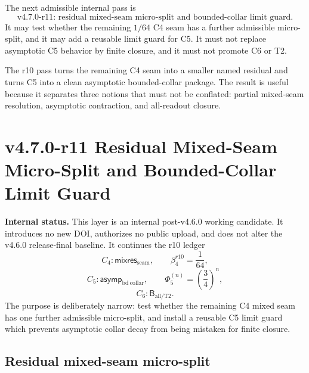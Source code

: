 \begin{corollary}
\label{cor:v470-r10-permitted-r11-direction}
The next admissible internal pass is
\[
\text{v4.7.0-r11: residual mixed-seam micro-split and bounded-collar limit guard.}
\]
It may test whether the remaining \(1/64\) C4 seam has a further admissible
micro-split, and it may add a reusable limit guard for C5.  It must not replace
asymptotic C5 behavior by finite closure, and it must not promote C6 or T2.
\end{corollary}

\begin{remark}[r10 summary]
The r10 pass turns the remaining C4 seam into a smaller named residual and turns
C5 into a clean asymptotic bounded-collar package.  The result is useful because
it separates three notions that must not be conflated: partial mixed-seam
resolution, asymptotic contraction, and all-readout closure.
\end{remark}


\section{v4.7.0-r11 Residual Mixed-Seam Micro-Split and Bounded-Collar Limit Guard}
\label{sec:v470-r11-mixed-seam-microsplit-limit-guard}

\noindent\textbf{Internal status.} This layer is an internal post-v4.6.0 working
candidate.  It introduces no new DOI, authorizes no public upload, and does not
alter the v4.6.0 release-final baseline.  It continues the r10 ledger
\[
C_4:\mathsf{mixres}_{\mathrm{seam}},\qquad \beta_4^{r10}=\frac1{64},
\]
\[
C_5:\mathsf{asymp}_{\mathrm{bd\ collar}},\qquad
\Phi_5^{(n)}=\left(\frac34\right)^n,
\]
\[
C_6:\mathsf B_{\mathrm{all/T2}}.
\]
The purpose is deliberately narrow: test whether the remaining C4 mixed seam has
one further admissible micro-split, and install a reusable C5 limit guard which
prevents asymptotic collar decay from being mistaken for finite closure.

\subsection{Residual mixed-seam micro-split}
\label{subsec:v470-r11-residual-mixed-seam-microsplit}

